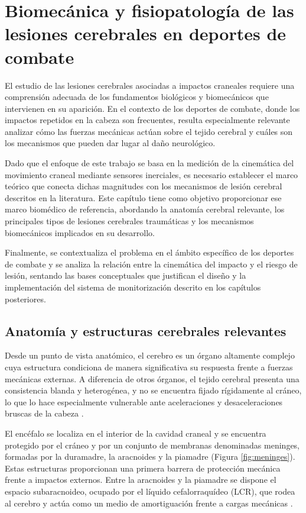 \renewcommand{\tablename}{Tabla} 

\section{Biomecánica y fisiopatología de las lesiones cerebrales en deportes de combate}

El estudio de las lesiones cerebrales asociadas a impactos craneales requiere una comprensión adecuada de los fundamentos biológicos y biomecánicos que intervienen en su aparición. En el contexto de los deportes de combate, donde los impactos repetidos en la cabeza son frecuentes, resulta especialmente relevante analizar cómo las fuerzas mecánicas actúan sobre el tejido cerebral y cuáles son los mecanismos que pueden dar lugar al daño neurológico.

Dado que el enfoque de este trabajo se basa en la medición de la cinemática del movimiento craneal mediante sensores inerciales, es necesario establecer el marco teórico que conecta dichas magnitudes con los mecanismos de lesión cerebral descritos en la literatura. Este capítulo tiene como objetivo proporcionar ese marco biomédico de referencia, abordando la anatomía cerebral relevante, los principales tipos de lesiones cerebrales traumáticas y los mecanismos biomecánicos implicados en su desarrollo.

Finalmente, se contextualiza el problema en el ámbito específico de los deportes de combate y se analiza la relación entre la cinemática del impacto y el riesgo de lesión, sentando las bases conceptuales que justifican el diseño y la implementación del sistema de monitorización descrito en los capítulos posteriores.

\subsection{Anatomía y estructuras cerebrales relevantes}

Desde un punto de vista anatómico, el cerebro es un órgano altamente complejo cuya estructura condiciona de manera significativa su respuesta frente a fuerzas mecánicas externas. A diferencia de otros órganos, el tejido cerebral presenta una consistencia blanda y heterogénea, y no se encuentra fijado rígidamente al cráneo, lo que lo hace especialmente vulnerable ante aceleraciones y desaceleraciones bruscas de la cabeza \cite{Meaney2011Biomechanics}.

El encéfalo se localiza en el interior de la cavidad craneal y se encuentra protegido por el cráneo y por un conjunto de membranas denominadas meninges, formadas por la duramadre, la aracnoides y la piamadre (Figura \ref{fig:meninges}). Estas estructuras proporcionan una primera barrera de protección mecánica frente a impactos externos. Entre la aracnoides y la piamadre se dispone el espacio subaracnoideo, ocupado por el líquido cefalorraquídeo (LCR), que rodea al cerebro y actúa como un medio de amortiguación frente a cargas mecánicas \cite{OpenStaxAnatomy}.

